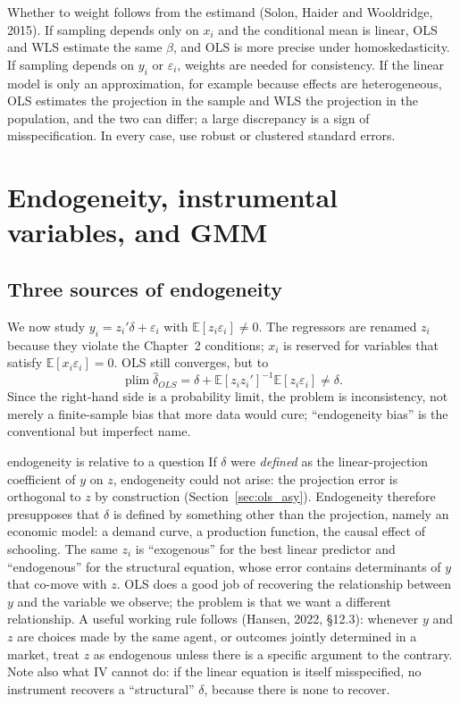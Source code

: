 \documentclass[11pt,a4paper]{article}
\newcommand{\E}{\mathbb{E}}
\newcommand{\plim}{\operatorname*{plim}}
\begin{document}
Whether to weight follows from the estimand (Solon, Haider and Wooldridge, 2015). If sampling depends only on $x_i$ and the conditional mean is linear, OLS and WLS estimate the same $\beta$, and OLS is more precise under homoskedasticity. If sampling depends on $y_i$ or $\varepsilon_i$, weights are needed for consistency. If the linear model is only an approximation, for example because effects are heterogeneous, OLS estimates the projection in the sample and WLS the projection in the population, and the two can differ; a large discrepancy is a sign of misspecification. In every case, use robust or clustered standard errors.

\section{Endogeneity, instrumental variables, and GMM}\label{sec:iv}

\subsection{Three sources of endogeneity}\label{sec:endog}

We now study $y_i=z_i'\delta+\varepsilon_i$ with $\E[z_i\varepsilon_i]\neq0$. The regressors are renamed $z_i$ because they violate the Chapter~2 conditions; $x_i$ is reserved for variables that satisfy $\E[x_i\varepsilon_i]=0$. OLS still converges, but to
\[
\plim\hat\delta_{OLS}=\delta+\E[z_iz_i']^{-1}\E[z_i\varepsilon_i]\neq\delta .
\]
Since the right-hand side is a probability limit, the problem is inconsistency, not merely a finite-sample bias that more data would cure; ``endogeneity bias'' is the conventional but imperfect name.

\begin{whybox}{endogeneity is relative to a question}
If $\delta$ were \emph{defined} as the linear-projection coefficient of $y$ on $z$, endogeneity could not arise: the projection error is orthogonal to $z$ by construction (Section~\ref{sec:ols_asy}). Endogeneity therefore presupposes that $\delta$ is defined by something other than the projection, namely an economic model: a demand curve, a production function, the causal effect of schooling. The same $z_i$ is ``exogenous'' for the best linear predictor and ``endogenous'' for the structural equation, whose error contains determinants of $y$ that co-move with $z$. OLS does a good job of recovering the relationship between $y$ and the variable we observe; the problem is that we want a different relationship. A useful working rule follows (Hansen, 2022, \S12.3): whenever $y$ and $z$ are choices made by the same agent, or outcomes jointly determined in a market, treat $z$ as endogenous unless there is a specific argument to the contrary. Note also what IV cannot do: if the linear equation is itself misspecified, no instrument recovers a ``structural'' $\delta$, because there is none to recover.
\end{whybox}
\end{document}
